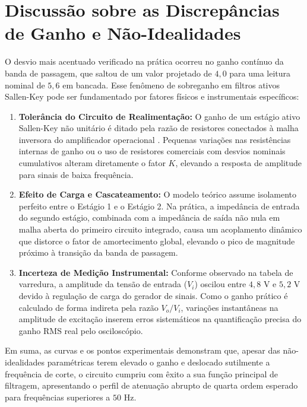 \section{Discussão sobre as Discrepâncias de Ganho e Não-Idealidades}

O desvio mais acentuado verificado na prática ocorreu no ganho contínuo da banda de passagem, que saltou de um valor projetado de $4,0$ para uma leitura nominal de $5,6$ em bancada. Esse fenômeno de sobreganho em filtros ativos Sallen-Key pode ser fundamentado por fatores físicos e instrumentais específicos:

\begin{enumerate}
	\item \textbf{Tolerância do Circuito de Realimentação:} O ganho de um estágio ativo Sallen-Key não unitário é ditado pela razão de resistores conectados à malha inversora do amplificador operacional \cite{nilsson}. Pequenas variações nas resistências internas de ganho ou o uso de resistores comerciais com desvios nominais cumulativos alteram diretamente o fator $K$, elevando a resposta de amplitude para sinais de baixa frequência.
	\item \textbf{Efeito de Carga e Cascateamento:} O modelo teórico assume isolamento perfeito entre o Estágio 1 e o Estágio 2. Na prática, a impedância de entrada do segundo estágio, combinada com a impedância de saída não nula em malha aberta do primeiro circuito integrado, causa um acoplamento dinâmico que distorce o fator de amortecimento global, elevando o pico de magnitude próximo à transição da banda de passagem.
	\item \textbf{Incerteza de Medição Instrumental:} Conforme observado na tabela de varredura, a amplitude da tensão de entrada ($V_i$) oscilou entre $4,8\text{ V}$ e $5,2\text{ V}$ devido à regulação de carga do gerador de sinais. Como o ganho prático é calculado de forma indireta pela razão $V_o/V_i$, variações instantâneas na amplitude de excitação inserem erros sistemáticos na quantificação precisa do ganho RMS real pelo osciloscópio.
\end{enumerate}

Em suma, as curvas e os pontos experimentais demonstram que, apesar das não-idealidades paramétricas terem elevado o ganho e deslocado sutilmente a frequência de corte, o circuito cumpriu com êxito a sua função principal de filtragem, apresentando o perfil de atenuação abrupto de quarta ordem esperado para frequências superiores a $50\text{ Hz}$.